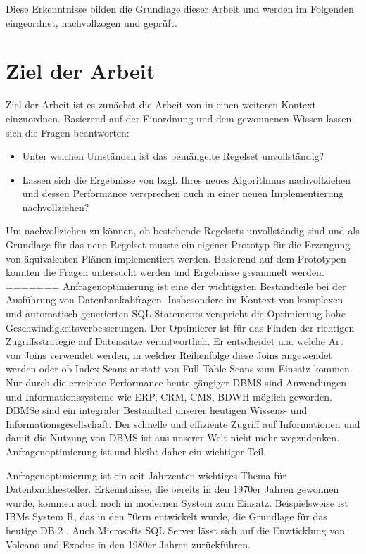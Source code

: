 Diese Erkenntnisse bilden die Grundlage dieser Arbeit und werden im Folgenden eingeordnet, nachvollzogen und geprüft.

\section{Ziel der Arbeit}

Ziel der Arbeit ist es zunächst die Arbeit von \cite{shanbhag2014optimizing} in einen weiteren Kontext einzuordnen. Basierend auf der Einordnung und dem gewonnenen Wissen lassen sich die Fragen beantworten:

\begin{itemize}
\item Unter welchen Umständen ist das bemängelte Regelset unvollständig? 
\item Lassen sich die Ergebnisse von \cite{shanbhag2014optimizing} bzgl. Ihres neues Algorithmus nachvollziehen und dessen Performance versprechen auch in einer neuen Implementierung nachvollziehen?
\end{itemize}

Um nachvollziehen zu können, ob bestehende Regelsets unvollständig sind und als Grundlage für das neue Regelset musste ein eigener Prototyp für die Erzeugung von äquivalenten Plänen implementiert werden. Basierend auf dem Prototypen konnten die Fragen untersucht werden und Ergebnisse gesammelt werden.
=======
Anfragenoptimierung ist eine der wichtigsten Bestandteile bei der Ausführung von Datenbankabfragen. Insbesondere im Kontext von komplexen und automatisch generierten SQL-Statements verspricht die Optimierung hohe Geschwindigkeitsverbesserungen. Der Optimierer ist für das Finden der richtigen Zugriffsstrategie auf Datensätze verantwortlich. Er entscheidet u.a. welche Art von Joins verwendet werden, in welcher Reihenfolge diese Joins angewendet werden oder ob Index Scans anstatt von Full Table Scans zum Einsatz kommen. Nur durch die erreichte Performance heute gängiger \ac{DBMS} sind Anwendungen und Informationssysteme wie \ac{ERP}, \ac{CRM}, \ac{CMS}, \ac{BDWH} möglich geworden. \ac{DBMS}e sind ein integraler Bestandteil unserer heutigen Wissens- und Informationsgesellschaft. Der schnelle und effiziente Zugriff auf Informationen und damit die Nutzung von \ac{DBMS} ist aus unserer Welt nicht mehr wegzudenken. Anfragenoptimierung ist und bleibt daher ein wichtiger Teil.

Anfragenoptimierung ist ein seit Jahrzenten wichtiges Thema für Datenbankhesteller. Erkenntnisse, die bereits in den 1970er Jahren gewonnen wurde, kommen auch noch in modernen System zum Einsatz. Beispielsweise ist IBMs System R, das in den 70ern entwickelt wurde, die Grundlage für das heutige DB 2  \cite{wade2012ibm}. Auch Microsofts SQL Server lässt sich auf die Enwticklung von Volcano und Exodus in den 1980er Jahren zurückführen.

